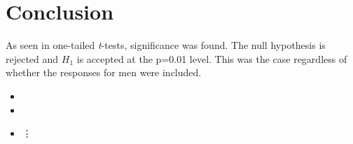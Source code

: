 \section {Conclusion}
\label{conclusion}

As seen in one-tailed \textit{t}-tests, significance was found.  The null hypothesis is rejected and $H_{1}$ is accepted at the p=0.01 level.  This was the case regardless of whether the responses for men were included.


\begin{itemize}
	\item 
	\item 
	\item 
	\vdots
\end{itemize}

